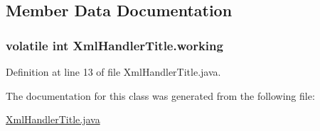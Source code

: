 \subsection{Member Data Documentation}
\hypertarget{classXmlHandlerTitle_a8430143db4f1036e5db03fbe7e3d451f}{
\subsubsection[{working}]{\setlength{\rightskip}{0pt plus 5cm}volatile int Xml\-Handler\-Title.\-working}}\label{classXmlHandlerTitle_a8430143db4f1036e5db03fbe7e3d451f}


Definition at line 13 of file Xml\-Handler\-Title.\-java.



The documentation for this class was generated from the following file\-:\begin{DoxyCompactItemize}
\item 
\hyperlink{XmlHandlerTitle_8java}{Xml\-Handler\-Title.\-java}\end{DoxyCompactItemize}

